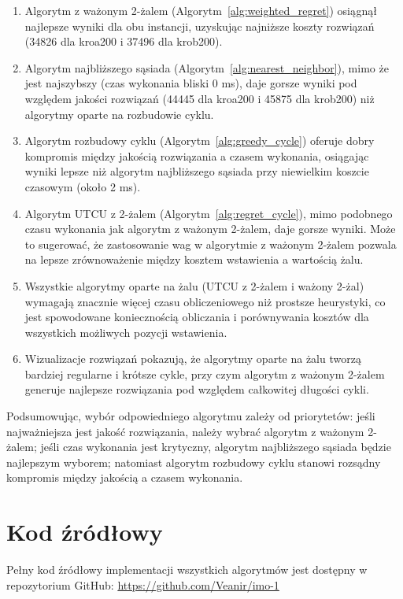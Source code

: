 \documentclass[12pt,a4paper]{article}
\begin{document}
\begin{enumerate}
    \item Algorytm z ważonym 2-żalem (Algorytm~\ref{alg:weighted_regret}) osiągnął najlepsze wyniki dla obu instancji, uzyskując najniższe koszty rozwiązań (34826 dla kroa200 i 37496 dla krob200).
    
    \item Algorytm najbliższego sąsiada (Algorytm~\ref{alg:nearest_neighbor}), mimo że jest najszybszy (czas wykonania bliski 0 ms), daje gorsze wyniki pod względem jakości rozwiązań (44445 dla kroa200 i 45875 dla krob200) niż algorytmy oparte na rozbudowie cyklu.
    
    \item Algorytm rozbudowy cyklu (Algorytm~\ref{alg:greedy_cycle}) oferuje dobry kompromis między jakością rozwiązania a czasem wykonania, osiągając wyniki lepsze niż algorytm najbliższego sąsiada przy niewielkim koszcie czasowym (około 2 ms).
    
    \item Algorytm UTCU z 2-żalem (Algorytm~\ref{alg:regret_cycle}), mimo podobnego czasu wykonania jak algorytm z ważonym 2-żalem, daje gorsze wyniki. Może to sugerować, że zastosowanie wag w algorytmie z ważonym 2-żalem pozwala na lepsze zrównoważenie między kosztem wstawienia a wartością żalu.
    
    \item Wszystkie algorytmy oparte na żalu (UTCU z 2-żalem i ważony 2-żal) wymagają znacznie więcej czasu obliczeniowego niż prostsze heurystyki, co jest spowodowane koniecznością obliczania i porównywania kosztów dla wszystkich możliwych pozycji wstawienia.
    
    \item Wizualizacje rozwiązań pokazują, że algorytmy oparte na żalu tworzą bardziej regularne i krótsze cykle, przy czym algorytm z ważonym 2-żalem generuje najlepsze rozwiązania pod względem całkowitej długości cykli.
\end{enumerate}

Podsumowując, wybór odpowiedniego algorytmu zależy od priorytetów: jeśli najważniejsza jest jakość rozwiązania, należy wybrać algorytm z ważonym 2-żalem; jeśli czas wykonania jest krytyczny, algorytm najbliższego sąsiada będzie najlepszym wyborem; natomiast algorytm rozbudowy cyklu stanowi rozsądny kompromis między jakością a czasem wykonania.

\section{Kod źródłowy}
Pełny kod źródłowy implementacji wszystkich algorytmów jest dostępny w repozytorium GitHub:
\url{https://github.com/Veanir/imo-1}
\end{document}
